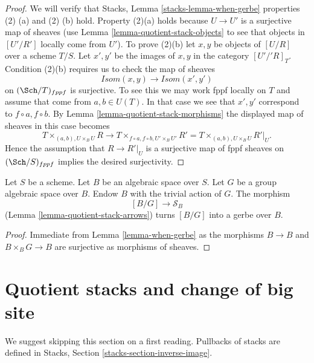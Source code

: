 \begin{proof}
We will verify that
Stacks, Lemma \ref{stacks-lemma-when-gerbe}
properties (2) (a) and (2) (b) hold. Property (2)(a) holds because $U \to U'$
is a surjective map of sheaves (use
Lemma \ref{lemma-quotient-stack-objects}
to see that objects in $[U'/R']$ locally come from $U'$).
To prove (2)(b) let $x, y$ be objects of $[U/R]$ over a scheme $T/S$.
Let $x', y'$ be the images of $x, y$ in the category $[U'/'R]_T$.
Condition (2)(b) requires us to check the map of sheaves
$$
\mathit{Isom}(x, y) \longrightarrow \mathit{Isom}(x', y')
$$
on $(\Sch/T)_{fppf}$ is surjective. To see this we may work
fppf locally on $T$ and assume that come from $a, b \in U(T)$.
In that case we see that $x', y'$ correspond to $f \circ a, f \circ b$. By
Lemma \ref{lemma-quotient-stack-morphisms}
the displayed map of sheaves in this case becomes
$$
T \times_{(a, b), U \times_B U} R
\longrightarrow
T \times_{f \circ a, f \circ b, U' \times_B U'} R' =
T \times_{(a, b), U \times_B U} R'|_U.
$$
Hence the assumption that $R \to R'|_U$ is a surjective map of fppf sheaves
on $(\Sch/S)_{fppf}$ implies the desired surjectivity.
\end{proof}

\begin{lemma}
\label{lemma-group-quotient-gerbe}
Let $S$ be a scheme. Let $B$ be an algebraic space over $S$. Let
$G$ be a group algebraic space over $B$. Endow $B$ with the trivial
action of $G$. The morphism
$$
[B/G] \longrightarrow \mathcal{S}_B
$$
(Lemma \ref{lemma-quotient-stack-arrows})
turns $[B/G]$ into a gerbe over $B$.
\end{lemma}

\begin{proof}
Immediate from
Lemma \ref{lemma-when-gerbe}
as the morphisms $B \to B$ and $B \times_B G \to B$ are surjective
as morphisms of sheaves.
\end{proof}








\section{Quotient stacks and change of big site}
\label{section-bigger-site}

\noindent
We suggest skipping this section on a first reading.
Pullbacks of stacks are defined in
Stacks, Section \ref{stacks-section-inverse-image}.

